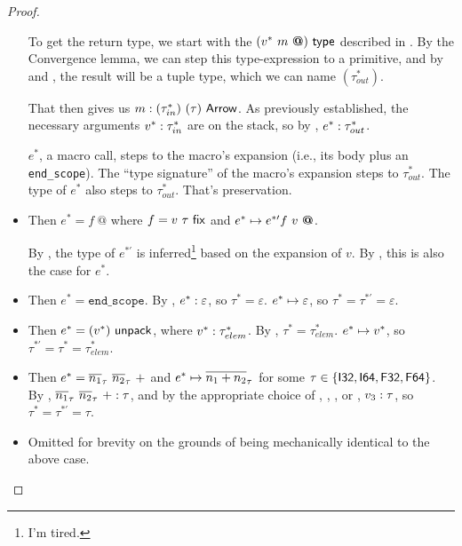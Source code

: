 \documentclass{article}
\begin{document}
\begin{proof}
\begin{itemize}
        To get the return type, we start with the $(v^* ~ m ~ \textbf{@}) ~ \mathsf{type}$ described in .
        By the Convergence lemma, we can step this type-expression to a primitive, and by  and , the result will be a tuple type, which we can name $(\tau_{out}^*)$.
        
        That then gives us $m : (\tau_{in}^*) ~ (\tau) ~ \mathsf{Arrow}$.
        As previously established, the necessary arguments $v^* : \tau_{in}^*$ are on the stack,
        so by , $e^* : \tau_{out}^*$.
        
        $e^*$, a macro call, steps to the macro's expansion (i.e., its body plus an \texttt{end_scope}). The ``type signature'' of the macro's expansion steps to $\tau_{out}^*$. The type of $e^*$ also steps to $\tau_{out}^*$. That's preservation.
    
    \item {}
        Then $e^* = f~ \textbf{@}$ where $f = v ~ \tau ~ \mathsf{fix}$ and $e^* \mapsto e^{*\prime} f~ v~ \textbf{@}$.
        
        By , the type of $e^{*\prime}$ is inferred\footnote{I'm tired.} based on the expansion of $v$.
        By , this is also the case for $e^*$.
    
    \item {}
        Then $e^* = \texttt{end_scope}$. By , $e^* : \varepsilon$, so $\tau^* = \varepsilon$. $e^* \mapsto \varepsilon$, so $\tau^* = \tau^{*\prime} = \varepsilon$.
    
    \item {}
        Then $e^* = (v^*) ~ \mathsf{unpack}$, where $v^* : \tau_{elem}^*$.
        By , $\tau^* = \tau_{elem}^*$. $e^* \mapsto v^*$, so $\tau^{*\prime} = \tau^* = \tau_{elem}^*$.
    
    \item {}
        Then $e^* = \overline{n_1}_\tau~ \overline{n_2}_\tau~ +$ and $e^* \mapsto \overline{n_1 + n_2}_\tau$ for some $\tau \in \{\mathsf{I32}, \mathsf{I64}, \mathsf{F32}, \mathsf{F64}\}$.
        By , $\overline{n_1}_\tau~ \overline{n_2}_\tau~ + : \tau$, and by the appropriate choice of , , , or , $v_3 : \tau$, so $\tau^* = \tau^{*\prime} = \tau$.
    
    \item {}
        Omitted for brevity on the grounds of being mechanically identical to the above case.
    

\end{itemize}
\end{proof}
\end{document}
